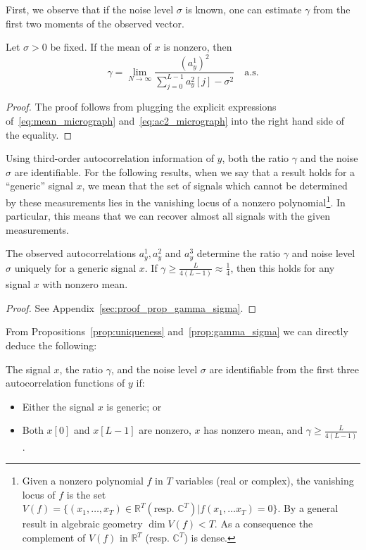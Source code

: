 \documentclass[9pt,twocolumn,twoside,lineno]{pnas-new}
\begin{document}
First, we observe that if the noise level $\sigma$ is known, one can estimate $\gamma$ from the first two moments of the observed vector.
%
\begin{proposition} \label{prop:gamma}
	Let $\sigma > 0$ be fixed. If the mean of $x$ is nonzero, then 
	\begin{equation*}
	\gamma = \lim_{N \to \infty}\frac{(a^1_y)^2}{\sum_{j=0}^{L-1}a_y^2[j]-\sigma^2} \quad \text{a.s.}
	\end{equation*}
\end{proposition}
\begin{proof}
	The proof follows from plugging the explicit expressions of~\eqref{eq:mean_micrograph} and~\eqref{eq:ac2_micrograph} into the right hand side of the equality.
\end{proof}

Using third-order autocorrelation information of $y$, both the ratio $\gamma$ and the noise $\sigma$ are identifiable. For the following results, when we say that a result holds for a ``generic'' signal $x$, we mean that the set of signals which cannot be determined by these measurements
lies in the vanishing locus of a nonzero polynomial\footnote{Given a  nonzero polynomial $f$ in $T$ variables (real or complex), the vanishing locus of $f$ is the set 
	$V(f) = \{(x_1, \ldots, x_T) \in \mathbb{R}^T (\text{resp. } \mathbb{C}^T) \vert f(x_1,\ldots x_T)=0\}$. By a general result in algebraic geometry $\dim V(f) < T$. As a consequence the complement of $V(f)$ in $\mathbb{R}^T$ (resp. $\mathbb{C}^T$) is dense.}. In particular, this means that we can recover
almost all signals with the given measurements.
%
%
\begin{proposition} \label{prop:gamma_sigma}
	The observed autocorrelations $a_y^1,a_y^2$ and  $a_y^3$ determine the ratio $\gamma$ and noise level $\sigma$ uniquely for a generic signal $x$. If $\gamma\geq\frac{L}{4(L-1)}\approx \frac{1}{4}$, then this holds for any signal $x$ with nonzero mean. 
	\begin{proof}
		See Appendix~\ref{sec:proof_prop_gamma_sigma}.
	\end{proof}
\end{proposition}

From Propositions~\ref{prop:uniqueness} and~\ref{prop:gamma_sigma} we can directly deduce the following:
\begin{corollary}
	 The signal $x$, the ratio $\gamma$, and the noise level $\sigma$ are identifiable from the first three autocorrelation functions of $y$ if:
	\begin{itemize}
		\item Either the signal $x$ is generic; or
		\item  Both $x[0]$  and $x[L-1]$ are nonzero, $x$ has nonzero mean, and $\gamma\geq\frac{L}{4(L-1)}$.
	\end{itemize}
\end{corollary}
\end{document}

